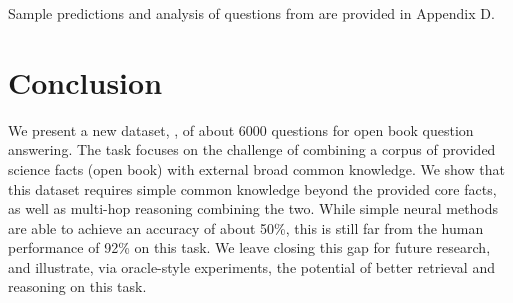 Sample predictions and analysis of questions from \devname are provided in Appendix D.

\section{Conclusion}
\label{sec:concl}

We present a new dataset, \obqa, of about 6000 questions for open book question answering. The task focuses on the challenge of combining a corpus of provided science facts (open book) with external broad common knowledge. We show that this dataset requires simple common knowledge beyond the provided core facts, as well as multi-hop reasoning combining the two. While simple neural methods are able to achieve an accuracy of about 50\%, this is still far from the human performance of 92\% on this task. We leave closing this gap for future research, and illustrate, via oracle-style experiments, the potential of better retrieval and reasoning on this task.


